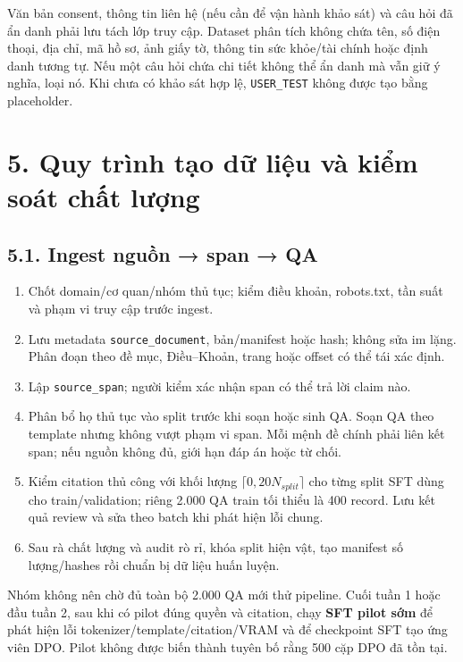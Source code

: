 \documentclass[11pt,a4paper]{article}
\providecommand{\tightlist}{\setlength{\itemsep}{0pt}\setlength{\parskip}{0pt}}
\begin{document}
Văn bản consent, thông tin liên hệ (nếu cần để vận hành khảo sát) và câu
hỏi đã ẩn danh phải lưu tách lớp truy cập. Dataset phân tích không chứa
tên, số điện thoại, địa chỉ, mã hồ sơ, ảnh giấy tờ, thông tin sức
khỏe/tài chính hoặc định danh tương tự. Nếu một câu hỏi chứa chi tiết
không thể ẩn danh mà vẫn giữ ý nghĩa, loại nó. Khi chưa có khảo sát hợp
lệ, \nolinkurl{USER_TEST} không được tạo bằng placeholder.

\section{5. Quy trình tạo dữ liệu và kiểm soát chất
lượng}\label{quy-truxecnh-tux1ea1o-dux1eef-liux1ec7u-vuxe0-kiux1ec3m-souxe1t-chux1ea5t-lux1b0ux1ee3ng}

\subsection{5.1. Ingest nguồn → span →
QA}\label{ingest-nguux1ed3n-span-qa}

\begin{enumerate}
\def\labelenumi{\arabic{enumi}.}
\tightlist
\item
  Chốt domain/cơ quan/nhóm thủ tục; kiểm điều khoản, robots.txt, tần
  suất và phạm vi truy cập trước ingest.
\item
  Lưu metadata \nolinkurl{source_document}, bản/manifest hoặc hash;
  không sửa im lặng. Phân đoạn theo đề mục, Điều--Khoản, trang hoặc
  offset có thể tái xác định.
\item
  Lập \nolinkurl{source_span}; người kiểm xác nhận span có thể trả lời
  claim nào.
\item
  Phân bổ họ thủ tục vào split trước khi soạn hoặc sinh QA. Soạn QA theo
  template nhưng không vượt phạm vi span. Mỗi mệnh đề chính phải liên
  kết span; nếu nguồn không đủ, giới hạn đáp án hoặc từ chối.
\item
  Kiểm citation thủ công với khối lượng \(\lceil0{,}20N_{split}\rceil\)
  cho từng split SFT dùng cho train/validation; riêng 2.000 QA train tối
  thiểu là 400 record. Lưu kết quả review và sửa theo batch khi phát
  hiện lỗi chung.
\item
  Sau rà chất lượng và audit rò rỉ, khóa split hiện vật, tạo manifest số
  lượng/hashes rồi chuẩn bị dữ liệu huấn luyện.
\end{enumerate}

Nhóm không nên chờ đủ toàn bộ 2.000 QA mới thử pipeline. Cuối tuần 1
hoặc đầu tuần 2, sau khi có pilot đúng quyền và citation, chạy
\textbf{SFT pilot sớm} để phát hiện lỗi tokenizer/template/citation/VRAM
và để checkpoint SFT tạo ứng viên DPO. Pilot không được biến thành tuyên
bố rằng 500 cặp DPO đã tồn tại.
\end{document}
